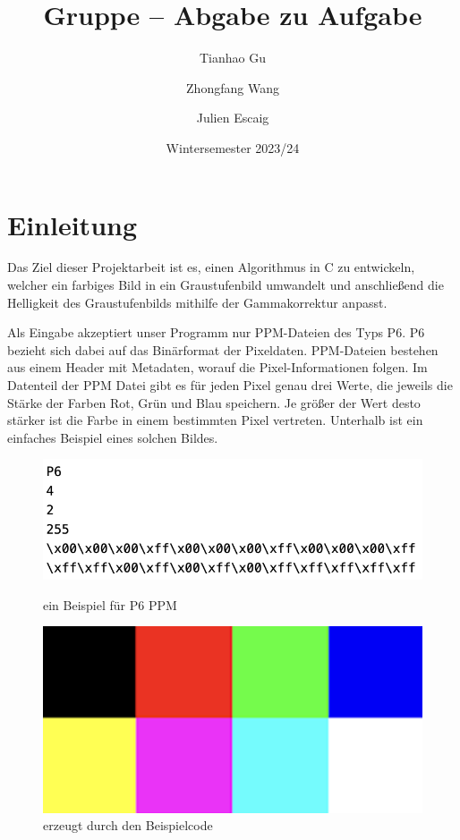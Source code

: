 \documentclass[course=erap]{aspdoc}
\author{Tianhao Gu \and Zhongfang Wang \and Julien Escaig}
\date{Wintersemester 2023/24} %
\title{Gruppe \theGroup{} -- Abgabe zu Aufgabe \theNumber}
\begin{document}
\maketitle

\section{Einleitung}


\par
Das Ziel dieser Projektarbeit ist es, einen Algorithmus in C zu entwickeln, welcher ein farbiges Bild in ein Graustufenbild umwandelt und anschließend die Helligkeit des Graustufenbilds mithilfe der Gammakorrektur anpasst.

\par
Als Eingabe akzeptiert unser Programm nur PPM-Dateien \cite{netpbm} des Typs P6. P6 bezieht sich dabei auf das Binärformat der Pixeldaten. PPM-Dateien bestehen aus einem Header mit Metadaten, worauf die Pixel-Informationen folgen. Im Datenteil der PPM Datei gibt es für jeden Pixel genau drei Werte, die jeweils die Stärke der Farben Rot, Grün und Blau speichern. Je größer der Wert desto stärker ist die Farbe in einem bestimmten Pixel vertreten. Unterhalb ist ein einfaches Beispiel eines solchen Bildes.

\begin{figure}[h]
\begin{minipage}{0.45\textwidth}
\centering
\includegraphics[width=\textwidth]{Bilder/demograph.png}
\caption{ein Beispiel für P6 PPM}
\end{minipage}
\hfill
\begin{minipage}{0.45\textwidth}
\centering
\includegraphics[width=\textwidth]{Bilder/demograph.ppm.png}
\caption{erzeugt durch den Beispielcode}
\end{minipage}
\end{figure}
\end{document}
